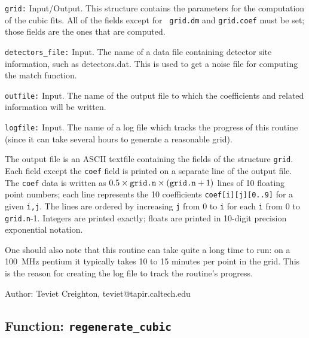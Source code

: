 \begin{description}
\item{\tt grid:}
  Input/Output.  This structure contains the parameters for the
  computation of the cubic fits.  All of the fields except for {\tt
  grid.dm} and {\tt grid.coef} must be set; those fields are the ones
  that are computed.

\item{\tt detectors\_file:}
  Input.  The name of a data file containing detector site
  information, such as detectors.dat.  This is used to get a noise
  file for computing the match function.

\item{\tt outfile:}
  Input.  The name of the output file to which the coefficients and
  related information will be written.

\item{\tt logfile:}
  Input.  The name of a log file which tracks the progress of this
  routine (since it can take several hours to generate a reasonable
  grid).

\end{description}

The output file is an ASCII textfile containing the fields of the
structure {\tt grid}.  Each field except the {\tt coef} field is
printed on a separate line of the output file.  The {\tt coef} data is
written as $0.5\times\hbox{\tt grid.n}\times(\hbox{\tt grid.n}+1)$
lines of 10 floating point numbers; each line represents the 10
coefficients {\tt coef[i][j][0..9]} for a given {\tt i,j}.  The lines
are ordered by increasing {\tt j} from 0 to {\tt i} for each {\tt i}
from 0 to {\tt grid.n}-1.  Integers are printed exactly; floats are
printed in 10-digit precision exponential notation.

One should also note that this routine can take quite a long time to
run: on a 100~MHz pentium it typically takes 10 to 15 minutes per
point in the grid.  This is the reason for creating the log file to
track the routine's progress.

\begin{description}
\item{Author:}
  Teviet Creighton, teviet@tapir.caltech.edu
\end{description}


\clearpage
\subsection{Function: {\tt regenerate\_cubic}}
\label{ss:regenerate_cubic}

